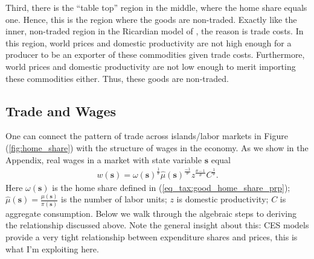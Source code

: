 \documentclass[pdftex,12pt]{article}
\begin{document}
\medskip
\noindent Third, there is the ``table top'' region in the middle, where the home share equals one. Hence, this is the region where the goods are non-traded. Exactly like the inner, non-traded region in the Ricardian model of \citet{dornbusch1977comparative}, the reason is trade costs. In this region, world prices and domestic productivity are not high enough for a producer to be an exporter of these commodities given trade costs. Furthermore, world prices and domestic productivity are not low enough to merit importing these commodities either. Thus, these goods are non-traded.

\subsection{Trade and Wages}

One can connect the pattern of trade across islands/labor markets in Figure (\ref{fig:home_share}) with the structure of wages in the economy. As we show in the Appendix, real wages in a market with state variable $\textbf{s}$ equal
\begin{align}
 w(\textbf{s}) = \omega(\textbf{s})^{\frac{1}{\theta}} \hat \mu( \textbf{s})^{\frac{-1}{\theta}}z^{\frac{\theta-1}{\theta}} C^{\frac{1}{\theta}}.
 \label{eq_tax:wage_home_share_prp}
\end{align}
Here $\omega(\textbf{s})$ is the home share defined in (\ref{eq_tax:good_home_share_prp}); $\hat \mu( \textbf{s}) = \frac{\mu(\textbf{s})}{\pi(\textbf{s})}$ is the number of labor units;  $z$ is domestic productivity; $C$ is aggregate consumption. Below we walk through the algebraic steps to deriving the relationship discussed above. Note the general insight about this: CES models provide a very tight relationship between expenditure shares and prices, this is what I'm exploiting here. 
\end{document}
